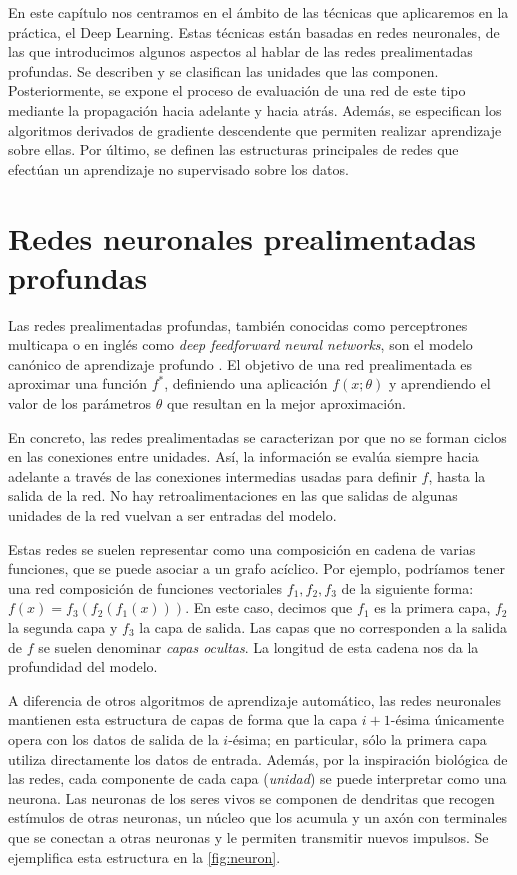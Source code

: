 
En este capítulo nos centramos en el ámbito de las técnicas que aplicaremos
en la práctica, el Deep Learning. Estas técnicas están basadas en redes neuronales, de las que introducimos algunos aspectos al hablar de las redes prealimentadas profundas. Se describen y se clasifican las unidades que las componen. Posteriormente, se expone el proceso de evaluación de una red de este tipo mediante la propagación hacia adelante y hacia atrás. Además, se especifican los algoritmos derivados de gradiente descendente que permiten realizar aprendizaje sobre ellas. Por último, se definen las estructuras principales de redes que efectúan un aprendizaje no supervisado sobre los datos.

\section{Redes neuronales prealimentadas
profundas}\label{redes-neuronales-prealimentadas-profundas}

\label{sec:feedforward}

Las redes prealimentadas profundas, también conocidas como perceptrones
multicapa o en inglés como \emph{deep feedforward neural networks}, son
el modelo canónico de aprendizaje profundo \autocite{goodfellow2016}. El
objetivo de una red prealimentada es aproximar una función \(f^{*}\),
definiendo una aplicación \(f(x;\theta)\) y aprendiendo el valor de los
parámetros \(\theta\) que resultan en la mejor aproximación.

En concreto, las redes prealimentadas se caracterizan por que no se
forman ciclos en las conexiones entre unidades. Así, la información se
evalúa siempre hacia adelante a través de las conexiones intermedias
usadas para definir \(f\), hasta la salida de la red. No hay
retroalimentaciones en las que salidas de algunas unidades de la red
vuelvan a ser entradas del modelo.

Estas redes se suelen representar como una composición en cadena de
varias funciones, que se puede asociar a un grafo acíclico. Por ejemplo,
podríamos tener una red composición de funciones vectoriales
\(f_1, f_2, f_3\) de la siguiente forma: \(f(x)=f_3(f_2(f_1(x)))\). En
este caso, decimos que \(f_1\) es la primera capa, \(f_2\) la segunda
capa y \(f_3\) la capa de salida. Las capas que no corresponden a la
salida de \(f\) se suelen denominar \emph{capas ocultas}. La longitud de
esta cadena nos da la profundidad del modelo.

A diferencia de otros algoritmos de aprendizaje automático, las redes
neuronales mantienen esta estructura de capas de forma que la capa
\(i+1\)-ésima únicamente opera con los datos de salida de la
\(i\)-ésima; en particular, sólo la primera capa utiliza directamente
los datos de entrada. Además, por la inspiración biológica de las redes,
cada componente de cada capa (\emph{unidad}) se puede interpretar como
una neurona. Las neuronas de los seres vivos se componen de dendritas que recogen estímulos de otras neuronas, un núcleo que los acumula y un axón con terminales que se conectan a otras neuronas y le permiten transmitir nuevos impulsos. Se ejemplifica esta estructura en la \autoref{fig:neuron}.

